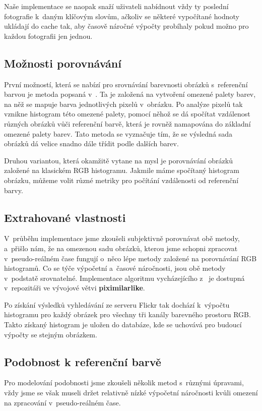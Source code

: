 \documentclass[12pt,oneside,a4paper]{article}
\begin{document}
Naše implementace se naopak snaží uživateli nabídnout vždy ty poslední fotografie k~daným klíčovým slovům, ačkoliv se některé vypočítané hodnoty ukládají do cache tak, aby časově náročné výpočty probíhaly pokud možno pro každou fotografii jen jednou.

\subsection{Možnosti porovnávání}
První možností, která se nabízí pro srovnávání barevnosti obrázků s~referenční barvou je metoda popsaná v~\cite{Mueller2k9}. Ta je založená na vytvoření omezené palety barev, na něž se mapuje barva jednotlivých pixelů v~obrázku. Po analýze pixelů tak vznikne histogram této omezené palety, pomocí něhož se dá spočítat vzdálenost různých obrázků vůči referenční barvě, která je rovněž namapována do základní omezené palety barev. Tato metoda se vyznačuje tím, že se výsledná sada obrázků dá velice snadno dále třídit podle dalších barev.

Druhou variantou, která okamžitě vytane na mysl je porovnávání obrázků založené na klasickém RGB histogramu. Jakmile máme spočítaný histogram obrázku, můžeme volit různé metriky pro počítání vzdálenosti od referenční barvy.

\subsection{Extrahované vlastnosti}

V~průběhu implementace jsme zkoušeli subjektivně porovnávat obě metody, a~přišlo nám, že na omezenou sadu obrázků, kterou jsme schopni zpracovat v~pseudo-reálném čase fungují o~něco lépe metody založené na porovnávání RGB histogramů. Co se týče výpočetní a~časové náročnosti, jsou obě metody v~podstatě srovnatelné. Implementace algoritmu vycházejícího z~\cite{Mueller2k9} je dostupná v~repozitáři \cite{official} ve vývojové větvi \textbf{piximilarlike}.

Po získání výsledků vyhledávání ze serveru Flickr tak dochází k~výpočtu histogramu pro každý obrázek pro všechny tři kanály barevného prostoru RGB. Takto získaný histogram je uložen do databáze, kde se uchovává pro budoucí výpočty se stejným obrázkem.

\subsection{Podobnost k referenční barvě}

Pro modelování podobnosti jsme zkoušeli několik metod s~různými úpravami, vždy jsme se však museli držet relativně nízké výpočetní náročnosti kvůli omezení na zpracování v~pseudo-reálném čase.
\end{document}
